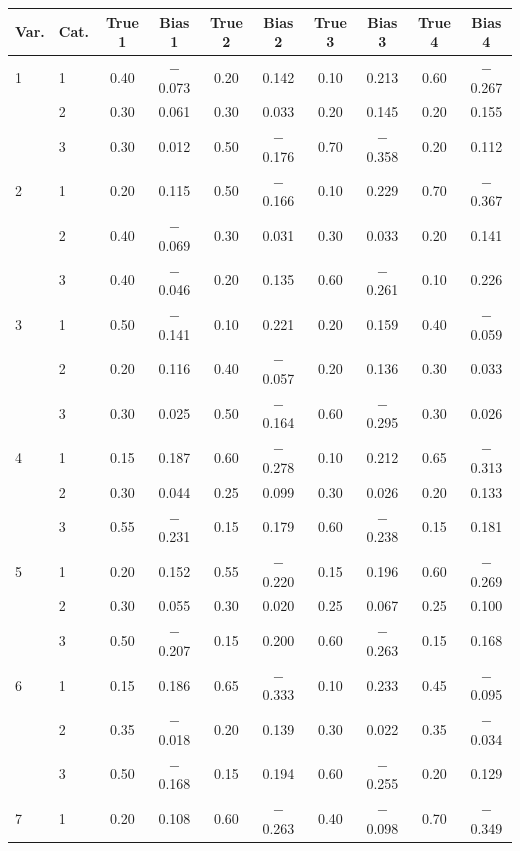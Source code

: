 \begin{longtable}{llcccccccc}
  \toprule
\textbf{Var.} & \textbf{Cat.} & \textbf{True 1} & \textbf{Bias 1} & \textbf{True 2} & \textbf{Bias 2} & \textbf{True 3} & \textbf{Bias 3} & \textbf{True 4} & \textbf{Bias 4} \\ 
  \midrule
1 & 1 & 0.40 & $-$0.073 & 0.20 & 0.142 & 0.10 & 0.213 & 0.60 & $-$0.267 \\ 
   & 2 & 0.30 & 0.061 & 0.30 & 0.033 & 0.20 & 0.145 & 0.20 & 0.155 \\ 
   & 3 & 0.30 & 0.012 & 0.50 & $-$0.176 & 0.70 & $-$0.358 & 0.20 & 0.112 \\ 
  2 & 1 & 0.20 & 0.115 & 0.50 & $-$0.166 & 0.10 & 0.229 & 0.70 & $-$0.367 \\ 
   & 2 & 0.40 & $-$0.069 & 0.30 & 0.031 & 0.30 & 0.033 & 0.20 & 0.141 \\ 
   & 3 & 0.40 & $-$0.046 & 0.20 & 0.135 & 0.60 & $-$0.261 & 0.10 & 0.226 \\ 
  3 & 1 & 0.50 & $-$0.141 & 0.10 & 0.221 & 0.20 & 0.159 & 0.40 & $-$0.059 \\ 
   & 2 & 0.20 & 0.116 & 0.40 & $-$0.057 & 0.20 & 0.136 & 0.30 & 0.033 \\ 
   & 3 & 0.30 & 0.025 & 0.50 & $-$0.164 & 0.60 & $-$0.295 & 0.30 & 0.026 \\ 
  4 & 1 & 0.15 & 0.187 & 0.60 & $-$0.278 & 0.10 & 0.212 & 0.65 & $-$0.313 \\ 
   & 2 & 0.30 & 0.044 & 0.25 & 0.099 & 0.30 & 0.026 & 0.20 & 0.133 \\ 
   & 3 & 0.55 & $-$0.231 & 0.15 & 0.179 & 0.60 & $-$0.238 & 0.15 & 0.181 \\ 
  5 & 1 & 0.20 & 0.152 & 0.55 & $-$0.220 & 0.15 & 0.196 & 0.60 & $-$0.269 \\ 
   & 2 & 0.30 & 0.055 & 0.30 & 0.020 & 0.25 & 0.067 & 0.25 & 0.100 \\ 
   & 3 & 0.50 & $-$0.207 & 0.15 & 0.200 & 0.60 & $-$0.263 & 0.15 & 0.168 \\ 
  6 & 1 & 0.15 & 0.186 & 0.65 & $-$0.333 & 0.10 & 0.233 & 0.45 & $-$0.095 \\ 
   & 2 & 0.35 & $-$0.018 & 0.20 & 0.139 & 0.30 & 0.022 & 0.35 & $-$0.034 \\ 
   & 3 & 0.50 & $-$0.168 & 0.15 & 0.194 & 0.60 & $-$0.255 & 0.20 & 0.129 \\ 
  7 & 1 & 0.20 & 0.108 & 0.60 & $-$0.263 & 0.40 & $-$0.098 & 0.70 & $-$0.349 \\ 

\end{longtable}
